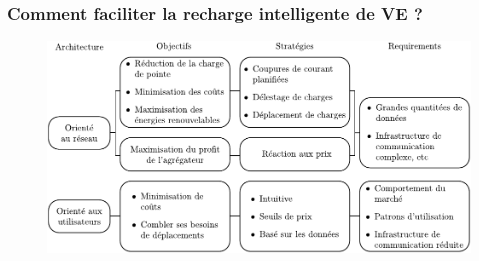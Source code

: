 \documentclass[french]{beamer}
\begin{document}
{%
% 
% 
% 
\begin{frame}
\frametitle{Comment faciliter la recharge intelligente de VE ?}
\begin{figure}
\includegraphics[width=\linewidth]{figConcMapFr.pdf}
\end{figure}

\end{frame}
% 

}
\end{document}
